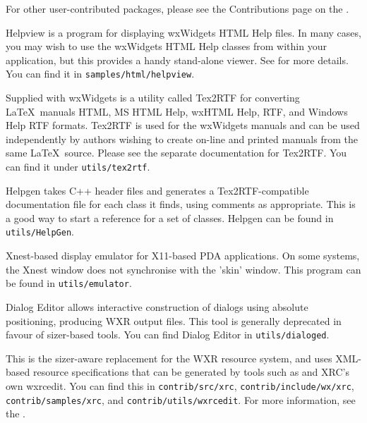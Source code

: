 For other user-contributed packages, please see the Contributions page
on the .

\begin{description}\itemsep=0pt
\item[{\bf Helpview}]
Helpview is a program for displaying wxWidgets HTML
Help files. In many cases, you may wish to use the wxWidgets HTML
Help classes from within your application, but this provides a
handy stand-alone viewer. See  for more details.
You can find it in {\tt samples/html/helpview}.

\item[{\bf Tex2RTF}]
Supplied with wxWidgets is a utility called Tex2RTF for converting\rtfsp
\LaTeX\ manuals HTML, MS HTML Help, wxHTML Help, RTF, and Windows
Help RTF formats. Tex2RTF is used for the wxWidgets manuals and can be used independently
by authors wishing to create on-line and printed manuals from the same\rtfsp
\LaTeX\ source. Please see the separate documentation for Tex2RTF.
You can find it under {\tt utils/tex2rtf}.

\item[{\bf Helpgen}]
Helpgen takes C++ header files and generates a Tex2RTF-compatible
documentation file for each class it finds, using comments as appropriate.
This is a good way to start a reference for a set of classes.
Helpgen can be found in {\tt utils/HelpGen}.

\item[{\bf Emulator}]
Xnest-based display emulator for X11-based PDA applications. On some
systems, the Xnest window does not synchronise with the
'skin' window. This program can be found in {\tt utils/emulator}.

\item[{\bf Dialog Editor}]
Dialog Editor allows interactive construction of dialogs using
absolute positioning, producing WXR output files. This tool is generally deprecated
in favour of sizer-based tools. You can find Dialog Editor
in {\tt utils/dialoged}.

\item[{\bf XRC resource system}]
This is the sizer-aware replacement for the WXR resource system, and uses
XML-based resource specifications that can be generated by tools
such as  and XRC's own wxrcedit.
You can find this in {\tt contrib/src/xrc}, {\tt contrib/include/wx/xrc}, {\tt contrib/samples/xrc}, and {\tt contrib/utils/wxrcedit}.
For more information, see the .


\end{description}
